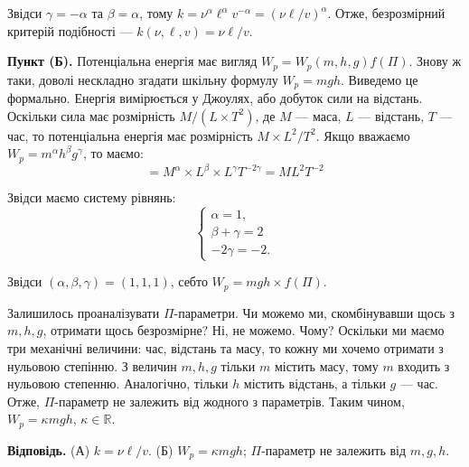 \documentclass{hw_template}
\begin{document}
Звідси $\gamma=-\alpha$ та $\beta=\alpha$, тому
$k=\nu^{\alpha}\ell^{\alpha}v^{-\alpha} = (\nu\ell/v)^{\alpha}$. Отже,
безрозмірний критерій подібності --- $k(\nu,\ell,v) = \nu\ell/v$.

\textbf{Пункт (Б).} Потенціальна енергія має вигляд $W_p = W_p(m,h,g)f(\Pi)$. Знову ж таки,
доволі нескладно згадати шкільну формулу $W_p=mgh$. Виведемо це формально. Енергія 
вимірюється у Джоулях, або добуток сили на відстань. Оскільки сила має розмірність $M/(L \times T^2)$, де
$M$ --- маса, $L$ --- відстань, $T$ --- час, то потенціальна енергія має розмірність $M \times L^2/T^2$.
Якщо вважаємо $W_p=m^{\alpha}h^{\beta}g^{\gamma}$, то маємо:
\begin{equation*}
    [W_p] = M^{\alpha} \times L^{\beta} \times L^{\gamma}T^{-2\gamma} = ML^2T^{-2}
\end{equation*} 

Звідси маємо систему рівнянь:
\begin{equation*}
    \begin{cases}
        \alpha = 1, \\
        \beta + \gamma = 2 \\
        -2\gamma = -2.
    \end{cases}
\end{equation*}

Звідси $(\alpha,\beta,\gamma) = (1,1,1)$, себто $W_p=mgh \times f(\Pi)$. 

Залишилось проаналізувати $\Pi$-параметри. Чи можемо ми, скомбінувавши щось з $m,h,g$,
отримати щось безрозмірне? Ні, не можемо. Чому? Оскільки ми маємо три механічні
величини: час, відстань та масу, то кожну ми хочемо отримати з нульовою степінню. 
З величин $m,h,g$ тільки $m$ містить масу, тому $m$ входить з нульовою степенню.
Аналогічно, тільки $h$ містить відстань, а тільки $g$ --- час. Отже, $\Pi$-параметр
не залежить від жодного з параметрів. Таким чином, $W_p=\kappa mgh$, $\kappa \in \mathbb{R}$.

\textbf{Відповідь.} (А) $k = \nu\ell/v$. (Б) $W_p = \kappa mgh$; $\Pi$-параметр не залежить від $m,g,h$.

\newpage
\end{document}
